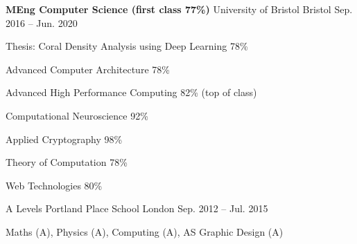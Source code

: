 \vspace{-1.1em}


\vspace{-0.2em}

\begin{cventries}

  \cventry
    {\textbf{MEng Computer Science (first class 77\%)}} %
    {University of Bristol} %
    {Bristol} %
    {Sep. 2016 -- Jun. 2020} %
    {
      \begin{cvitems} %
        \item {Thesis: Coral Density Analysis using Deep Learning 78\%}
        \item {Advanced Computer Architecture 78\%}
        \item {Advanced High Performance Computing 82\% (top of class)}
        \item {Computational Neuroscience 92\%}
        \item {Applied Cryptography 98\%}
        \item {Theory of Computation 78\%}
        \item {Web Technologies 80\%}
      \end{cvitems}
    }
    
  \cventry
    {A Levels} %
    {Portland Place School} %
    {London} %
    {Sep. 2012 -- Jul. 2015} %
    {
      \begin{cvitems} %
        \item {Maths (A), Physics (A), Computing (A), AS Graphic Design (A)}
      \end{cvitems}
    }
\end{cventries}
